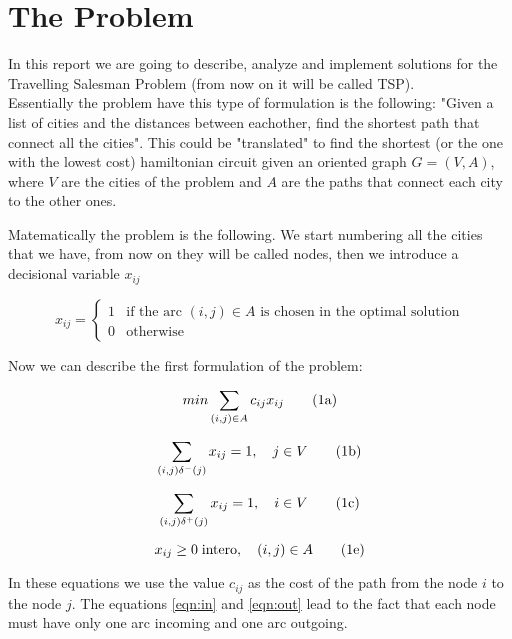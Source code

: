 \section{\centering The Problem}

In this report we are going to describe, analyze and implement solutions for the Travelling Salesman Problem (from now on it will be called TSP).\\
Essentially the problem have this type of formulation is the following: "Given a list of cities and the distances between eachother, find the shortest path that connect all the cities".
This could be "translated" to find the shortest (or the one with the lowest cost) hamiltonian circuit given an oriented graph $G=(V, A)$, where $V$ are the cities of the problem and $A$ are the paths that connect each city to the other ones.

Matematically the problem is the following.  We start numbering all the cities that we have, from now on they will be called nodes, then we introduce a decisional variable $x_{ij}$

\begin{equation}
	x_{ij}=
	\begin{cases}
		1 & \text{if the arc $(i, j) \in A$ is chosen in the optimal solution}\\
		0 & \text{otherwise}
	\end{cases}
\end{equation}

Now we can describe the first formulation of the problem:

\begin{equation}
	\label{eqn:cost}
	min\sum_{(i,j)\in A}c_{ij}x_{ij}
	\stepcounter{equation}\tag{{\theequation}a}
\end{equation}

\begin{equation}
	\label{eqn:in}
	\sum_{(i,j)\delta^-(j)}x_{ij}=1, \quad j\in V
	\tag{{\theequation}b}
\end{equation}

\begin{equation}
	\label{eqn:out}
	\sum_{(i,j)\delta^+(j)}x_{ij}=1, \quad i\in V
	\tag{{\theequation}c}
\end{equation}


\begin{equation}
	x_{ij}\ge 0 \; \text{intero} , \quad (i, j) \in A
	\tag{{\theequation}e}
\end{equation}

In these equations we use the value $c_{ij}$ as the cost of the path from the node $i$ to the node $j$. The equations \ref{eqn:in} and \ref{eqn:out} lead to the fact that each node must have only one arc incoming and one arc outgoing. 
